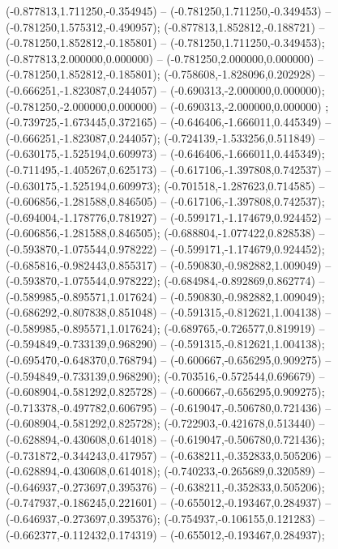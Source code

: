  (-0.877813,1.711250,-0.354945) -- (-0.781250,1.711250,-0.349453) -- (-0.781250,1.575312,-0.490957);
 (-0.877813,1.852812,-0.188721) -- (-0.781250,1.852812,-0.185801) -- (-0.781250,1.711250,-0.349453);
 (-0.877813,2.000000,0.000000) -- (-0.781250,2.000000,0.000000) -- (-0.781250,1.852812,-0.185801);
 (-0.758608,-1.828096,0.202928) -- (-0.666251,-1.823087,0.244057) -- (-0.690313,-2.000000,0.000000);
 (-0.781250,-2.000000,0.000000) -- (-0.690313,-2.000000,0.000000) ;
 (-0.739725,-1.673445,0.372165) -- (-0.646406,-1.666011,0.445349) -- (-0.666251,-1.823087,0.244057);
 (-0.724139,-1.533256,0.511849) -- (-0.630175,-1.525194,0.609973) -- (-0.646406,-1.666011,0.445349);
 (-0.711495,-1.405267,0.625173) -- (-0.617106,-1.397808,0.742537) -- (-0.630175,-1.525194,0.609973);
 (-0.701518,-1.287623,0.714585) -- (-0.606856,-1.281588,0.846505) -- (-0.617106,-1.397808,0.742537);
 (-0.694004,-1.178776,0.781927) -- (-0.599171,-1.174679,0.924452) -- (-0.606856,-1.281588,0.846505);
 (-0.688804,-1.077422,0.828538) -- (-0.593870,-1.075544,0.978222) -- (-0.599171,-1.174679,0.924452);
 (-0.685816,-0.982443,0.855317) -- (-0.590830,-0.982882,1.009049) -- (-0.593870,-1.075544,0.978222);
 (-0.684984,-0.892869,0.862774) -- (-0.589985,-0.895571,1.017624) -- (-0.590830,-0.982882,1.009049);
 (-0.686292,-0.807838,0.851048) -- (-0.591315,-0.812621,1.004138) -- (-0.589985,-0.895571,1.017624);
 (-0.689765,-0.726577,0.819919) -- (-0.594849,-0.733139,0.968290) -- (-0.591315,-0.812621,1.004138);
 (-0.695470,-0.648370,0.768794) -- (-0.600667,-0.656295,0.909275) -- (-0.594849,-0.733139,0.968290);
 (-0.703516,-0.572544,0.696679) -- (-0.608904,-0.581292,0.825728) -- (-0.600667,-0.656295,0.909275);
 (-0.713378,-0.497782,0.606795) -- (-0.619047,-0.506780,0.721436) -- (-0.608904,-0.581292,0.825728);
 (-0.722903,-0.421678,0.513440) -- (-0.628894,-0.430608,0.614018) -- (-0.619047,-0.506780,0.721436);
 (-0.731872,-0.344243,0.417957) -- (-0.638211,-0.352833,0.505206) -- (-0.628894,-0.430608,0.614018);
 (-0.740233,-0.265689,0.320589) -- (-0.646937,-0.273697,0.395376) -- (-0.638211,-0.352833,0.505206);
 (-0.747937,-0.186245,0.221601) -- (-0.655012,-0.193467,0.284937) -- (-0.646937,-0.273697,0.395376);
 (-0.754937,-0.106155,0.121283) -- (-0.662377,-0.112432,0.174319) -- (-0.655012,-0.193467,0.284937);
